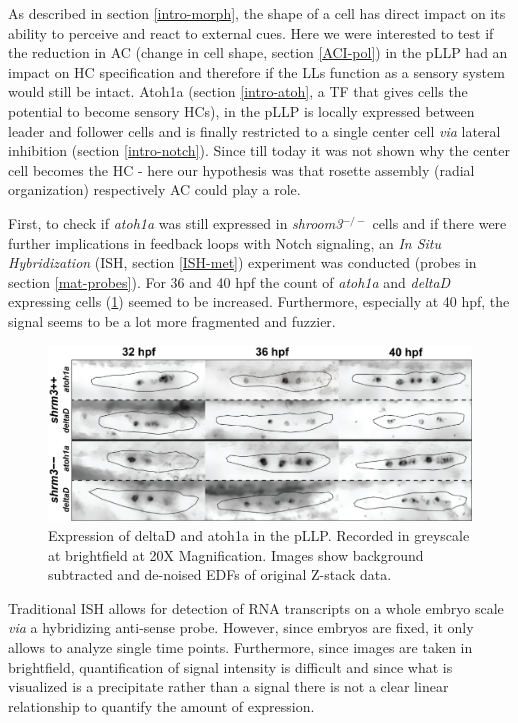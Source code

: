 \documentclass[10pt, b5paper, singlespacinge, twoside]{reedthesis} %
\theoremstyle{definition}
\theoremstyle{definition}
\theoremstyle{definition}
\theoremstyle{remark}
\begin{document}
As described in section \ref{intro-morph}, the shape of a cell has direct impact on its ability to perceive and react to external cues. Here we were interested to test if the reduction in AC (change in cell shape, section \ref{ACI-pol}) in the pLLP had an impact on HC specification and therefore if the LLs function as a sensory system would still be intact. Atoh1a (section \ref{intro-atoh}, a TF that gives cells the potential to become sensory HCs), in the pLLP is locally expressed between leader and follower cells and is finally restricted to a single center cell \emph{via} lateral inhibition (section \ref{intro-notch}). Since till today it was not shown why the center cell becomes the HC - here our hypothesis was that rosette assembly (radial organization) respectively AC could play a role.

First, to check if \emph{atoh1a} was still expressed in \emph{shroom3}\(^{-/-}\) cells and if there were further implications in feedback loops with Notch signaling, an \emph{In Situ Hybridization} (ISH, section \ref{ISH-met}) experiment was conducted (probes in section \ref{mat-probes}). For 36 and 40 hpf the count of \emph{atoh1a} and \emph{deltaD} expressing cells (\ref{fig:hcish}) seemed to be increased. Furthermore, especially at 40 hpf, the signal seems to be a lot more fragmented and fuzzier.


\begin{figure}

{\centering \includegraphics[width=0.85\linewidth]{figures/results/05_atoh/hc_ish} 

}

\caption[Expression of deltaD and atoh1a in the pLLP]{Expression of deltaD and atoh1a in the pLLP. Recorded in greyscale at brightfield at 20X Magnification. Images show background subtracted and de-noised EDFs of original Z-stack data.}\label{fig:hcish}
\end{figure}
Traditional ISH allows for detection of RNA transcripts on a whole embryo scale \emph{via} a hybridizing anti-sense probe. However, since embryos are fixed, it only allows to analyze single time points. Furthermore, since images are taken in brightfield, quantification of signal intensity is difficult and since what is visualized is a precipitate rather than a signal there is not a clear linear relationship to quantify the amount of expression.
\end{document}
